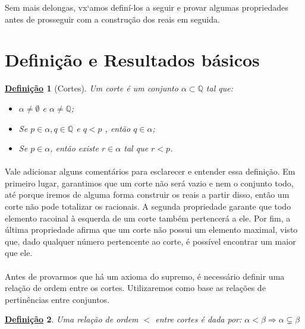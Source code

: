 \documentclass{article}
\newtheorem{definition}{\underline{Defini\c c\~ao}}
\begin{document}
Sem mais delongas, vx`amos defin\'i-los a seguir e provar algumas propriedades antes de prosseguir com a constru\c c\~ao dos reais em seguida.

\section{Defini\c c\~ao e Resultados b\'asicos}
\begin{definition}[Cortes] 
Um corte \'e um conjunto $\alpha\subset\mathbb{Q}$ tal que:
\begin{itemize}
\item [i)] $\alpha\neq\emptyset$ e $\alpha\neq\mathbb{Q}$;
\item [ii)] Se $p\in\alpha, q\in\mathbb{Q}$ e $q<p$ , ent\~ao $q\in\alpha$;
\item [iii)] Se $p\in\alpha$, ent\~ao existe $r\in\alpha$ tal que $r < p$.
\end{itemize}
\end{definition}

\paragraph{} Vale adicionar alguns coment\'arios para esclarecer e entender essa defini\c c\~ao. Em primeiro lugar, garantimos que um corte n\~ao ser\'a vazio e nem o conjunto todo, at\'e porque iremos de alguma forma construir os reais a partir disso, ent\~ao um corte n\~ao pode totalizar os racionais. A segunda propriedade garante que todo elemento racoinal \`a esquerda de um corte tamb\'em pertencer\'a a ele. Por fim, a \'ultima propriedade afirma que um corte n\~ao possui um elemento maximal, visto que, dado qualquer n\'umero pertencente ao corte, \'e poss\'ivel encontrar um maior que ele.

\paragraph{} Antes de provarmos que h\'a um axioma do supremo, \'e necess\'ario definir uma rela\c c\~ao de ordem entre os cortes. Utilizaremos como base as rela\c c\~oes de pertin\^encias entre conjuntos.

\begin{definition}
Uma rela\c c\~ao de ordem $<$ entre cortes \'e dada por: $\alpha < \beta \Rightarrow \alpha\subsetneq\beta$
\end{definition}
\end{document}
